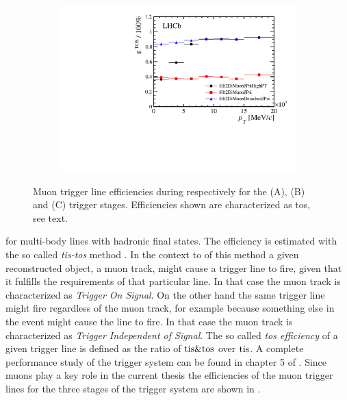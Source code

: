 \begin{figure}[t!]
\begin{subfigure}{0.5\textwidth}
    \includegraphics[width=\textwidth,trim=0.45cm 0cm 0.4cm 0cm, clip=true]{Figures/Chapter2/hlt2_muon_eff}
    \caption{}
    \label{det_run_one_hlt2_muon_line_eff}
  \end{subfigure}
  \caption{Muon trigger line efficiencies during \runone respectively for the \lzero (A), \hltone (B) and \hlttwo (C) trigger stages.
           Efficiencies shown are characterized as tos, see text.}
  \label{det_run_one_muon_line_eff}
\end{figure}

\noindent for multi-body lines with hadronic final states. The efficiency is estimated with the so
called {\it tis-tos} method \cite{Aaij:1493820}. In the context to of this method a given reconstructed object,
\ie a muon track, might cause a trigger line to fire, given that it fulfills the requirements of that particular line.
In that case the muon track is characterized as {\it Trigger On Signal}. On the other hand the same trigger line might
fire regardless of the muon track, for example because something else in the event might cause the line
to fire. In that case the muon track is characterized as {\it Trigger Independent of Signal}.
The so called {\it tos efficiency} of a given trigger line is defined as the ratio of ${\rm tis}\&{\rm tos}$
over ${\rm tis}$. A complete performance study of the trigger system can be found in chapter 5
of \cite{Aaij:2014jba}. Since muons play a key role in the current thesis the efficiencies of the muon
trigger lines for the three stages of the \lhcb trigger system are  shown in .

